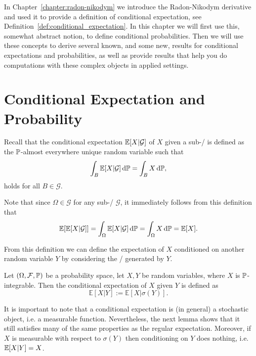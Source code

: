 
In Chapter~\ref{chapter:radon-nikodym} we introduce the Radon-Nikodym derivative and used it to provide a definition of conditional expectation, see Definition~\ref{def:conditional_expectation}. In this chapter we will first use this, somewhat abstract notion, to define conditional probabilities. Then we will use these concepts to derive several known, and some new, results for conditional expectations and probabilities, as well as provide results that help you do computations with these complex objects in applied settings.


\section{Conditional Expectation and Probability}

Recall that the conditional expectation $\mathbb E[X|\mathcal{G}]$ of $X$ given a sub-\sigalg/ is defined as the $\mathbb P$-almost everywhere unique random variable such that
\[
	\int_B \mathbb E[X|\mathcal{G}] \, \mathrm{d} \mathbb P = \int_B X \, \mathrm{d} \mathbb P,
\]
holds for all $B \in \mathcal{G}$.

Note that since $\Omega \in \mathcal{G}$ for any sub-\sigalg/ $\mathcal{G}$, it immediately follows from this definition that
\begin{equation}\label{eq:law_total_expectation}
	\mathbb E[\mathbb E[X|\mathcal{G}]] = \int_\Omega \mathbb E[X|\mathcal{G}] \, \mathrm{d} \mathbb P = \int_\Omega X \, \mathrm{d} \mathbb P = \mathbb E[X].
\end{equation}

From this definition we can define the expectation of $X$ conditioned on another random variable $Y$ by considering the \sigalg/ generated by $Y$.

\begin{definition}
Let $(\Omega, \mathcal F, \mathbb P)$ be a probability space, let $X,Y$ be random variables, where $X$ is $\mathbb P$-integrable. Then the conditional expectation of $X$ given $Y$ is defined as
\[
\mathbb{E}[X | Y] := \mathbb{E}[ X | \sigma(Y) ].
\]	
\end{definition}


It is important to note that a conditional expectation is (in general) a stochastic object, i.e. a measurable function. Nevertheless, the next lemma shows that it still satisfies many of the same properties as the regular expectation. Moreover, if $X$ is measurable with respect to $\sigma(Y)$ then conditioning on $Y$ does nothing, i.e. $\mathbb E[X|Y] = X$.

